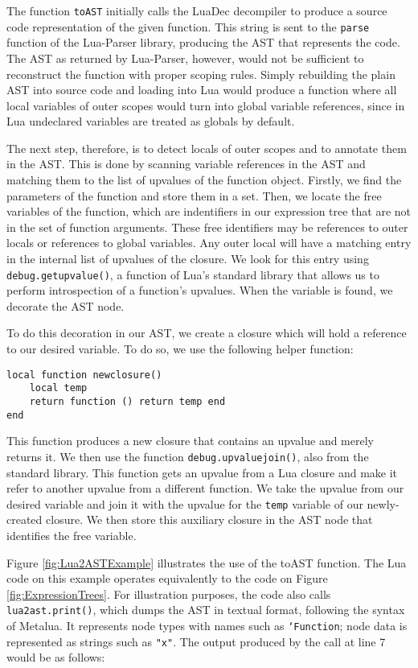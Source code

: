 \documentclass[english]{llncs}
\begin{document}
The function \texttt{toAST} initially calls the LuaDec decompiler to produce a source code representation of the given function.
This string is sent to the \texttt{parse} function of the Lua-Parser library, producing the AST that represents the code.
The AST as returned by Lua-Parser, however, would not be sufficient to reconstruct the function with proper scoping rules.
Simply rebuilding the plain AST into source code and loading into Lua would produce a function where all local variables
of outer scopes would turn into global variable references, since in Lua undeclared variables are treated as globals
by default.

The next step, therefore, is to detect locals of outer scopes and to annotate them in the AST. 
This is done by scanning variable references in the AST and matching them to the list of upvalues
of the function object.
Firstly, we find the parameters of the function and store them in a set.
Then, we locate the free variables of the function, which are indentifiers in our expression tree that are not in the set of function arguments.
These free identifiers may be references to outer locals or references to global variables.
Any outer local will have a matching entry in the internal list of upvalues of the closure.
We look for this entry using \texttt{debug.getupvalue()}, a function of Lua's standard library
that allows us to perform introspection of a function's upvalues.
When the variable is found, we decorate the AST node.

To do this decoration in our AST, we create a closure which will hold a reference
to our desired variable.
To do so, we use the following helper function:

\begin{verbatim}
local function newclosure()
    local temp
    return function () return temp end
end
\end{verbatim}

This function produces a new closure that contains an upvalue and merely returns it.
We then use the function \texttt{debug.upvaluejoin()}, also from the standard library.
This function gets an upvalue from a Lua closure and make it refer to another upvalue
from a different function. 
We take the upvalue from our desired variable and join it with the upvalue for the \texttt{temp} variable of our newly-created closure.
We then store this auxiliary closure in the AST node that identifies the free variable.

Figure \ref{fig:Lua2ASTExample} illustrates the use of the toAST function.
The Lua code on this example operates equivalently to the code on Figure \ref{fig:ExpressionTrees}.
For illustration purposes, the code also calls \texttt{lua2ast.print()}, which dumps the AST in textual format,
following the syntax of Metalua. It represents node types with names such as \texttt{`Function}; node data is represented as strings such as \texttt{"x"}.
The output produced by the call at line 7 would be as follows:
\end{document}
